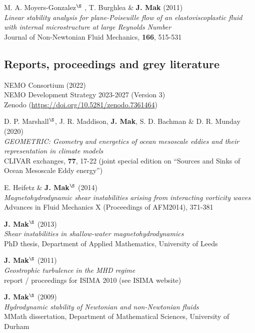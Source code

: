 \documentclass[letterpaper]{article}
\renewenvironment{itemize}{
  \begin{list}{}{
    \setlength{\leftmargin}{1.5em}
  }
}{
  \end{list}
}
\begin{document}
\begin{itemize}
\item[1.] M. A. Moyers-Gonzalez$^{\S}$ , T. Burghlea \& \textbf{J. Mak}
(2011)\\
\textit{Linear stability analysis for plane-Poiseuille flow of an
elastoviscoplastic fluid with internal microstructure at large Reynolds
Number}\\
Journal of Non-Newtonian Fluid Mechanics, \textbf{166}, 515-531
\end{itemize}

\subsection*{Reports, proceedings and grey literature}
\begin{itemize}

\item[F.] NEMO Consortium (2022)\\
NEMO Development Strategy 2023-2027 (Version 3)\\
Zenodo (\url{https://doi.org/10.5281/zenodo.7361464})

\item[E.] D. P. Marshall$^{\S}$, J. R. Maddison, \textbf{J. Mak}, S. D. Bachman \& D. R. Munday (2020)\\
\textit{GEOMETRIC: Geometry and energetics of ocean mesoscale eddies and their representation in climate models}\\
CLIVAR exchanges, \textbf{77}, 17-22 (joint special edition on ``Sources and Sinks
of Ocean Mesoscale Eddy energy'')

\item[D.] E. Heifetz \& \textbf{J. Mak}$^{\S}$ (2014)\\
\textit{Magnetohydrodynamic shear instabilities arising from interacting
vorticity waves}\\
Advances in Fluid Mechanics X (Proceedings of AFM2014), 371-381

\item[C.] \textbf{J. Mak}$^{\S}$ (2013)\\
\textit{Shear instabilities in shallow-water magnetohydrodynamics}\\
PhD thesis, Department of Applied Mathematics, University of Leeds

\item[B.] \textbf{J. Mak}$^{\S}$ (2011)\\
\textit{Geostrophic turbulence in the MHD regime}\\
report / proceedings for ISIMA 2010 (see ISIMA website)

\item[A.] \textbf{J. Mak}$^{\S}$ (2009)\\
\textit{Hydrodynamic stability of Newtonian and non-Newtonian fluids}\\
MMath dissertation, Department of Mathematical Sciences, University of Durham
\end{itemize}
\end{document}
